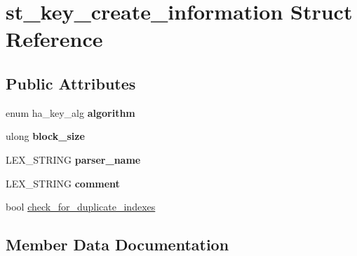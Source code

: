 \hypertarget{structst__key__create__information}{}\section{st\+\_\+key\+\_\+create\+\_\+information Struct Reference}
\label{structst__key__create__information}
\subsection*{Public Attributes}
\begin{DoxyCompactItemize}
\item 
\mbox{\label{structst__key__create__information_ab63eefb731673413b217990e26485292}} 
enum ha\+\_\+key\+\_\+alg {\bfseries algorithm}
\item 
\mbox{\label{structst__key__create__information_ac08e4eb3805e253919000d496ed1ff8a}} 
ulong {\bfseries block\+\_\+size}
\item 
\mbox{\label{structst__key__create__information_a437b400ea3e18124c1c81afd0f55ad8d}} 
L\+E\+X\+\_\+\+S\+T\+R\+I\+NG {\bfseries parser\+\_\+name}
\item 
\mbox{\label{structst__key__create__information_a6280f5114fa69f4b2627bf9c661febe7}} 
L\+E\+X\+\_\+\+S\+T\+R\+I\+NG {\bfseries comment}
\item 
bool \mbox{\hyperlink{structst__key__create__information_afb3cc6d51dba1814dff322bb7a771a99}{check\+\_\+for\+\_\+duplicate\+\_\+indexes}}
\end{DoxyCompactItemize}


\subsection{Member Data Documentation}
\mbox{\label{structst__key__create__information_afb3cc6d51dba1814dff322bb7a771a99}} 
